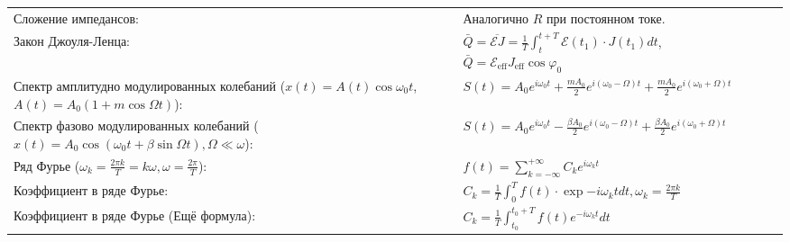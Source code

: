 \documentclass{article}
\begin{document}
\begin{tabular}{ |p{6cm}|p{3cm}|p{6cm}|p{3.5cm}|  }
                                                                           &
                                                                           \\
\hline
Сложение импедансов:                                                       &
Аналогично $R$ при постоянном токе.                                        &
                                                                           &
                                                                           \\
\hline
Закон Джоуля-Ленца:                                                        &
$\bar{Q}=\overline{\mathcal{E} J}=\frac{1}{T} \int_{t}^{t+T} \mathcal{E}\left(t_{1}\right) \cdot J\left(t_{1}\right) d t$,
$\bar{Q}=\mathcal{E}_{\mathrm{eff}} J_{\mathrm{eff}} \cos \varphi_{0}$     &
                                                                           &
                                                                           \\
\hline
Спектр амплитудно модулированных колебаний ($x(t)=A(t) \cos \omega_{0} t$, $A(t)=A_{0}(1+m \cos \Omega t)$):&
$S(t)=A_{0} e^{i \omega_{0} t}+\frac{m A_{0}}{2} e^{i\left(\omega_{0}-\Omega\right) t}+\frac{m A_{0}}{2} e^{i\left(\omega_{0}+\Omega\right) t}$&
                                                                           &
                                                                           \\
\hline
Спектр фазово модулированных колебаний ($x(t)=A_{0} \cos \left(\omega_{0} t+\beta \sin \Omega t\right), \Omega \ll \omega$):&
$S(t)=A_{0} e^{i \omega_{0} t}-\frac{\beta A_{0}}{2} e^{i\left(\omega_{0}-\Omega\right) t}+\frac{\beta A_{0}}{2} e^{i\left(\omega_{0}+\Omega\right) t}$&
                                                                           &
                                                                           \\
\hline
Ряд Фурье ($\omega_{k}=\frac{2 \pi k}{T}=k \omega, \omega=\frac{2 \pi}{T}$):&
$f(t)=\sum_{k=-\infty}^{+\infty} C_{k} e^{i \omega_{k} t}$                 &
                                                                           &
                                                                           \\
\hline
Коэффициент в ряде Фурье:                                                  &
$C_{k}=\frac{1}{T} \int_{0}^{T} f(t) \cdot \exp{-i \omega_{k} t} d t, \omega_{k}=\frac{2 \pi k}{T}$&
                                                                           &
                                                                           \\
\hline
Коэффициент в ряде Фурье (Ещё формула):                                    &
$C_{k}=\frac{1}{T} \int_{t_{0}}^{t_{0}+T} f(t) e^{-i \omega_{k} t} d t$    &
                                                                           &
                                                                           \\
\hline
\end{tabular}
\end{document}

